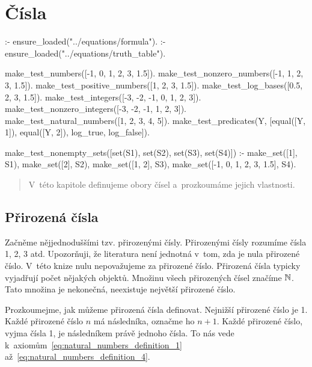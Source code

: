 \chapter{Čísla}

\begin{prolog}
:- ensure_loaded("../equations/formula").
:- ensure_loaded("../equations/truth_table").

make_test_numbers([-1, 0, 1, 2, 3, 1.5]).
make_test_nonzero_numbers([-1, 1, 2, 3, 1.5]).
make_test_positive_numbers([1, 2, 3, 1.5]).
make_test_log_bases([0.5, 2, 3, 1.5]).
make_test_integers([-3, -2, -1, 0, 1, 2, 3]).
make_test_nonzero_integers([-3, -2, -1, 1, 2, 3]).
make_test_natural_numbers([1, 2, 3, 4, 5]).
make_test_predicates(Y, [equal([Y, 1]), equal([Y, 2]), log_true, log_false]).

make_test_nonempty_sets([set(S1), set(S2), set(S3), set(S4)]) :-
	make_set([1], S1),
	make_set([2], S2),
	make_set([1, 2], S3),
	make_set([-1, 0, 1, 2, 3, 1.5], S4).
	
\end{prolog}


\begin{abstract}
V~této kapitole definujeme obory čísel a~prozkoumáme jejich vlastnosti.
\end{abstract}

\section{Přirozená čísla}

Začněme nějjednoduššími tzv. přirozenými čísly. Přirozenými čísly rozumíme čísla 1, 2, 3 atd. Upozorňuji, že literatura není jednotná v~tom, zda je nula přirozené číslo. V~této knize nulu nepovažujeme za přirozené číslo. Přirozená čísla typicky vyjadřují počet nějakých objektů. Množinu všech přirozených čísel značíme \(\mathbb{N}\). Tato množina je nekonečná, neexistuje největší přirozené číslo.

Prozkoumejme, jak můžeme přirozená čísla definovat. Nejnižší přirozené číslo je 1. Každé přirozené číslo \(n\) má
následníka, označme ho \(n + 1\). Každé přirozené číslo, vyjma čísla 1, je následníkem právě jednoho čísla. To nás vede k~axiomům~\eqref{eq:natural_numbers_definition_1} až~\eqref{eq:natural_numbers_definition_4}.

